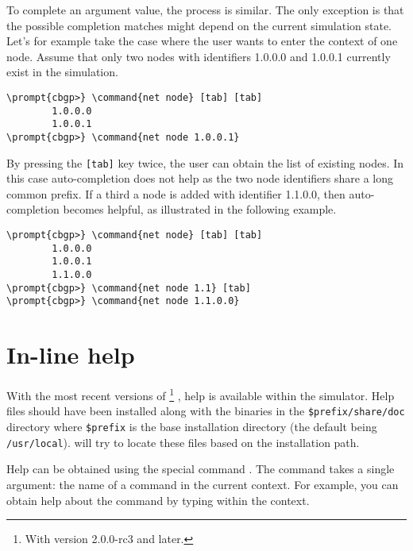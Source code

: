 To complete an argument value, the process is similar. The only
exception is that the possible completion matches might depend on the
current simulation state. Let's for example take the case where the
user wants to enter the context of one node. Assume that only two
nodes with identifiers 1.0.0.0 and 1.0.0.1 currently exist in the
simulation.

\begin{Verbatim}[commandchars=\\\{\}]
\prompt{cbgp>} \command{net node} [tab] [tab]
        1.0.0.0
        1.0.0.1
\prompt{cbgp>} \command{net node 1.0.0.1}
\end{Verbatim}

By pressing the \verb|[tab]| key twice, the user can
obtain the list of existing nodes. In this case auto-completion does
not help as the two node identifiers share a long common prefix. If a
third a node is added with identifier 1.1.0.0, then auto-completion
becomes helpful, as illustrated in the following example.

\begin{Verbatim}[commandchars=\\\{\}]
\prompt{cbgp>} \command{net node} [tab] [tab]
        1.0.0.0
        1.0.0.1
        1.1.0.0
\prompt{cbgp>} \command{net node 1.1} [tab]
\prompt{cbgp>} \command{net node 1.1.0.0}
\end{Verbatim}

\section{In-line help}
\label{sec:user-interface-help}

With the most recent versions of 
\footnote{With version 2.0.0-rc3 and later.}
, help is available within the simulator. Help files should have been
installed along with the binaries in the \verb|$prefix/share/doc|
directory where \verb|$prefix| is the base installation directory (the
default being \verb|/usr/local|).  will try to
locate these files based on the installation path.

Help can be obtained using the special command
. The  command takes a single argument:
the name of a command in the current context. For example, you can
obtain help about the  command by typing
 within the  context.

